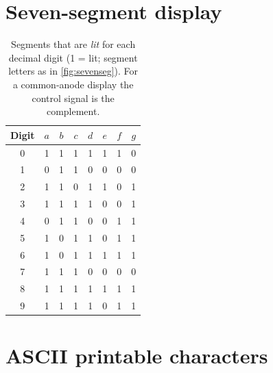 \section{Seven-segment display}
\begin{table}[htbp]
\centering
\small
\caption{Segments that are \emph{lit} for each decimal digit (1 = lit; segment letters as in \cref{fig:sevenseg}). For a common-anode display the control signal is the complement.}
\begin{tabular}{c|ccccccc}
\toprule Digit & $a$&$b$&$c$&$d$&$e$&$f$&$g$\\ \midrule
0&1&1&1&1&1&1&0\\1&0&1&1&0&0&0&0\\2&1&1&0&1&1&0&1\\3&1&1&1&1&0&0&1\\4&0&1&1&0&0&1&1\\
5&1&0&1&1&0&1&1\\6&1&0&1&1&1&1&1\\7&1&1&1&0&0&0&0\\8&1&1&1&1&1&1&1\\9&1&1&1&1&0&1&1\\ \bottomrule
\end{tabular}
\end{table}

\section{ASCII printable characters}
\begin{table}[htbp]
\centering
\footnotesize
\caption{The printable ASCII characters (codes 32--126)~\cite{ansix34}.}

\end{table}
